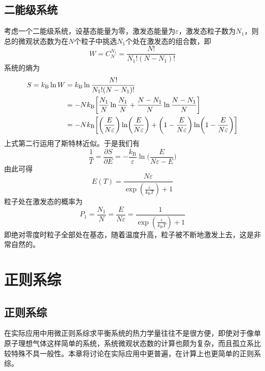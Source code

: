 \documentclass[UTF8,oneside,openany]{ctexbook}
\newcommand\kb{k_{\text{B}}}
\begin{document}
\section{二能级系统}
考虑一个二能级系统，设基态能量为零，激发态能量为$\varepsilon$，激发态粒子数为$N_1$，则总的微观状态数为在$N$个粒子中挑选$N_1$个处在激发态的组合数，即
\begin{equation}
W=C_{N}^{N_1}=\frac{N!}{N_1!(N-N_1)!}
\end{equation}
系统的熵为
\begin{align}
S=\kb\ln W&=\kb\ln\frac{N!}{N_1!(N-N_1)!}\notag\\
&=-N\kb\biggl[\frac{N_1}{N}\ln\frac{N_1}{N}+\frac{N-N_1}{N}\ln\frac{N-N_1}{N}\biggr]\notag\\
&=-N\kb\biggl[\biggl(\frac{E}{N\varepsilon}\biggr)\ln\biggl(\frac{E}{N\varepsilon}\biggr)+\biggl(1-\frac{E}{N\varepsilon}\biggr)\ln\biggl(1-\frac{E}{N\varepsilon}\biggr)\biggr]
\end{align}
上式第二行运用了斯特林近似。于是我们有
\begin{equation}
\frac{1}{T}=\frac{\partial S}{\partial E}=-\frac{\kb}{\varepsilon}\ln\biggl(\frac{E}{N\varepsilon-E}\biggr)
\end{equation}
由此可得
\begin{equation}
E(T)=\frac{N\varepsilon}{\exp(\frac{\varepsilon}{\kb T})+1}
\end{equation}
粒子处在激发态的概率为
\begin{equation}
P_1=\frac{N_1}{N}=\frac{E}{N\varepsilon}=\frac{1}{\exp(\frac{\varepsilon}{\kb T})+1}
\end{equation}
即绝对零度时粒子全部处在基态，随着温度升高，粒子被不断地激发上去，这是非常自然的。
\chapter{正则系综}
\section{正则系综}
在实际应用中用微正则系综求平衡系统的热力学量往往不是很方便，即使对于像单原子理想气体这样简单的系统，系统微观状态数的计算也颇为复杂，而且孤立系比较特殊不具一般性。本章将讨论在实际应用中更普遍，在计算上也更简单的正则系综。
\end{document}
